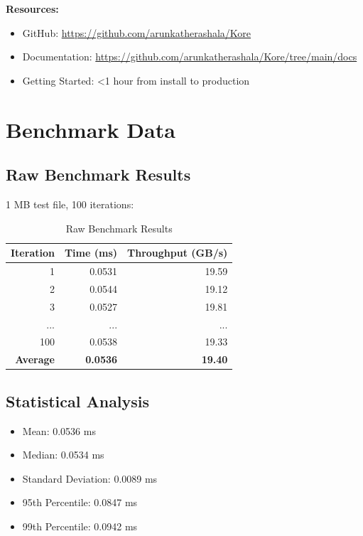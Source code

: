 \documentclass[12pt,a4paper]{report}
\begin{document}
\textbf{Resources:}
\begin{itemize}
    \item GitHub: \url{https://github.com/arunkatherashala/Kore}
    \item Documentation: \url{https://github.com/arunkatherashala/Kore/tree/main/docs}
    \item Getting Started: <1 hour from install to production
\end{itemize}

\appendix

\chapter{Benchmark Data}

\section{Raw Benchmark Results}

1 MB test file, 100 iterations:

\begin{table}[H]
\centering
\begin{tabular}{|r|r|r|}
\hline
\textbf{Iteration} & \textbf{Time (ms)} & \textbf{Throughput (GB/s)} \\
\hline
1 & 0.0531 & 19.59 \\
2 & 0.0544 & 19.12 \\
3 & 0.0527 & 19.81 \\
... & ... & ... \\
100 & 0.0538 & 19.33 \\
\hline
\textbf{Average} & \textbf{0.0536} & \textbf{19.40} \\
\hline
\end{tabular}
\caption{Raw Benchmark Results}
\end{table}

\section{Statistical Analysis}

\begin{itemize}
    \item Mean: 0.0536 ms
    \item Median: 0.0534 ms
    \item Standard Deviation: 0.0089 ms
    \item 95th Percentile: 0.0847 ms
    \item 99th Percentile: 0.0942 ms
\end{itemize}
\end{document}
